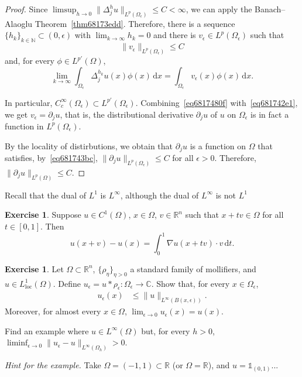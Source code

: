 \documentclass[a4paper,9pt]{amsart}
\newcommand{\N}{\mathbb{N}}	%
\newcommand{\R}{\mathbb{R}}	%
\newcommand{\C}{\mathbb{C}}	%
\newcommand{\did}{\,\mathrm{d}}	%
\newcommand{\de}{\partial}		%
\newcommand{\loc}{\mathrm{loc}}
\newcommand{\grad}{\nabla}
\newcommand{\one}{{\mathds 1\!}}
\theoremstyle{plain}
\theoremstyle{definition}
\newtheorem{exercise}[proposition]{Exercise}%
\theoremstyle{remark}
\begin{document}
\begin{proof}
	Since $\limsup_{h\to0} \|\Delta_j^h u \|_{L^p(\Omega_\epsilon)} \le C<\infty$,
	we can apply the Banach–Alaoglu Theorem~\ref{thm68173edd}.
	Therefore, there is a sequence $\{h_k\}_{k\in\N}\subset(0,\epsilon)$ with $\lim_{k\to\infty}h_k=0$
	and there is $v_\epsilon\in L^p(\Omega_\epsilon)$ such that
	\begin{equation}\label{eq681743bc}
		\|v_\epsilon\|_{L^p(\Omega_\epsilon)} \le C 
	\end{equation}
	and, for every $\phi\in L^{p'}(\Omega)$, 
	\begin{equation}\label{eq681742e1}
		\lim_{k\to\infty} \int_{\Omega_\epsilon} \Delta_j^{h_k} u(x) \phi(x) \did x 
		= \int_{\Omega_\epsilon} v_\epsilon(x) \phi(x) \did x .
	\end{equation}
	
	In particular, $C^\infty_c(\Omega_\epsilon)\subset L^{p'}(\Omega_\epsilon)$.
	Combining~\eqref{eq6817480f} with~\eqref{eq681742e1}, we get
	$v_\epsilon=\de_ju$, that is, the distributional derivative $\de_ju$ of $u$ on $\Omega_\epsilon$ is in fact a function in $L^p(\Omega_\epsilon)$.
	
	By the locality of distirbutions, we obtain that $\de_ju$ is a function on $\Omega$
	that satisfies, by~\eqref{eq681743bc}, $\|\de_ju\|_{L^p(\Omega_\epsilon)} \le C$ for all $\epsilon>0$.
	Therefore, $\|\de_ju\|_{L^p(\Omega)} \le C$.
\end{proof}

Recall that the dual of $L^1$ is $L^\infty$, although the dual of $L^\infty$ is not $L^1$

\begin{exercise}
	Suppose $u\in C^1(\Omega)$, $x\in\Omega$, $v\in\R^n$ such that $x+tv\in\Omega$ for all $t\in[0,1]$.
	Then
	\begin{equation}\label{eq68175caa}
		u(x+v)-u(x) = \int_0^1 \grad u(x+tv)\cdot v \did t .
	\end{equation}
\end{exercise}

	
\begin{exercise}\label{ex683577c9}
	Let $\Omega\subset\R^n$,
	$\{\rho_\eta\}_{\eta>0}$ a standard family of mollifiers,
	and $u\in L^1_\loc(\Omega)$. 
	Define $u_\epsilon = u*\rho_\epsilon : \Omega_\epsilon\to\C$.
	Show that, for every $x\in\Omega_\epsilon$,
	\begin{align}
		u_\epsilon(x) &\le \| u \|_{L^\infty(B(x,\epsilon))} .
	\end{align}
	Moreover, for almost every $x\in\Omega$, $\lim_{\epsilon\to0} u_\epsilon(x) = u(x)$.
	
	Find an example where $u\in L^\infty(\Omega)$ but, for every $h>0$, 
	$\liminf_{\epsilon\to0} \|u_\epsilon - u\|_{L^\infty(\Omega_h)} > 0$.
	
	{\it Hint for the example.}
	Take $\Omega = (-1,1)\subset\R$ (or $\Omega=\R$), and $u=\one_{(0,1)}$...
\end{exercise}
\end{document}

